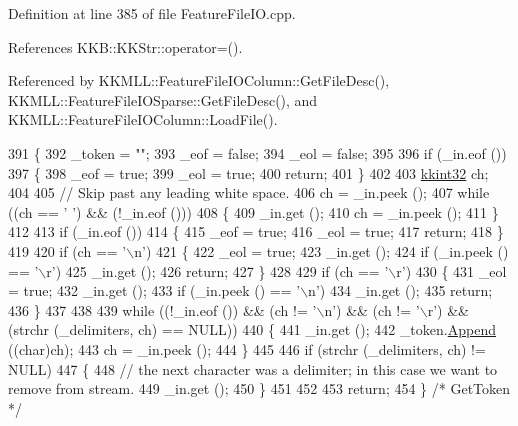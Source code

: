 Definition at line 385 of file Feature\+File\+I\+O.\+cpp.



References K\+K\+B\+::\+K\+K\+Str\+::operator=().



Referenced by K\+K\+M\+L\+L\+::\+Feature\+File\+I\+O\+Column\+::\+Get\+File\+Desc(), K\+K\+M\+L\+L\+::\+Feature\+File\+I\+O\+Sparse\+::\+Get\+File\+Desc(), and K\+K\+M\+L\+L\+::\+Feature\+File\+I\+O\+Column\+::\+Load\+File().


\begin{DoxyCode}
391 \{
392   \_token = \textcolor{stringliteral}{""};
393   \_eof = \textcolor{keyword}{false};
394   \_eol = \textcolor{keyword}{false};
395 
396   \textcolor{keywordflow}{if}  (\_in.eof ())
397   \{
398     \_eof = \textcolor{keyword}{true};
399     \_eol = \textcolor{keyword}{true};
400     \textcolor{keywordflow}{return};
401   \}
402 
403   \hyperlink{namespace_k_k_b_a8fa4952cc84fda1de4bec1fbdd8d5b1b}{kkint32}  ch;
404 
405   \textcolor{comment}{// Skip past any leading white space.}
406   ch = \_in.peek ();
407   \textcolor{keywordflow}{while}  ((ch == \textcolor{charliteral}{' '})  &&  (!\_in.eof ()))
408   \{
409     \_in.get ();
410     ch = \_in.peek ();
411   \}
412 
413   \textcolor{keywordflow}{if}  (\_in.eof ())
414   \{
415     \_eof = \textcolor{keyword}{true};
416     \_eol = \textcolor{keyword}{true};
417     \textcolor{keywordflow}{return};
418   \}
419 
420   \textcolor{keywordflow}{if}  (ch == \textcolor{charliteral}{'\(\backslash\)n'})
421   \{
422     \_eol = \textcolor{keyword}{true};
423     \_in.get ();
424     \textcolor{keywordflow}{if}  (\_in.peek () == \textcolor{charliteral}{'\(\backslash\)r'})
425       \_in.get ();
426     \textcolor{keywordflow}{return};
427   \}
428 
429   \textcolor{keywordflow}{if}  (ch == \textcolor{charliteral}{'\(\backslash\)r'})
430   \{
431     \_eol = \textcolor{keyword}{true};
432     \_in.get ();
433     \textcolor{keywordflow}{if}  (\_in.peek () == \textcolor{charliteral}{'\(\backslash\)n'})
434       \_in.get ();
435     \textcolor{keywordflow}{return};
436   \}
437 
438 
439   \textcolor{keywordflow}{while}  ((!\_in.eof ())  &&  (ch != \textcolor{charliteral}{'\(\backslash\)n'})  &&  (ch != \textcolor{charliteral}{'\(\backslash\)r'})  &&  (strchr (\_delimiters, ch) == NULL))
440   \{
441     \_in.get ();
442     \_token.\hyperlink{class_k_k_b_1_1_k_k_str_ad23c5c4dccd6122f8629ce95b762f247}{Append} ((\textcolor{keywordtype}{char})ch);
443     ch = \_in.peek ();
444   \}
445 
446   \textcolor{keywordflow}{if}  (strchr (\_delimiters, ch) != NULL)
447   \{
448     \textcolor{comment}{// the next character was a delimiter;  in this case we want to remove from stream.}
449     \_in.get ();
450   \}
451 
452 
453   \textcolor{keywordflow}{return};
454 \}  \textcolor{comment}{/* GetToken */}
\end{DoxyCode}

